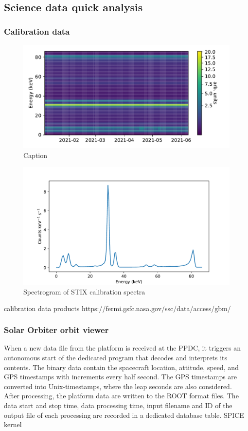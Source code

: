 \documentclass{aa}
\begin{document}
\subsection{Science data quick analysis}
\subsubsection{Calibration data}
\begin{figure}
    \centering
    \includegraphics[width=0.8\linewidth]{figures/calibrationSpectrogram.pdf}
    \caption{Caption}
    \label{fig:calibrationSpectrum}
\end{figure}
\begin{figure}
    \centering
    \includegraphics[width=0.8\linewidth]{figures/calibrationSpectrum.pdf}
    \caption{Spectrogram of STIX calibration spectra}
    \label{fig:calibrationSpectrogram}
\end{figure}

calibration data products
https://fermi.gsfc.nasa.gov/ssc/data/access/gbm/
\subsubsection{Solar Orbiter orbit viewer}


When a new data file from the platform is received at the PPDC,
it triggers an autonomous start of the dedicated program that decodes and
interprets its contents. The binary data contain the spacecraft location, attitude, speed, and GPS timestamps with increments every half second. The GPS timestamps are converted into Unix-timestamps, where the leap seconds are also considered. After processing, the platform data are written to the ROOT format files. The data start and stop time, data processing time, input filename and ID of the output file of each processing are recorded in a dedicated database table.
SPICE kernel
\end{document}
